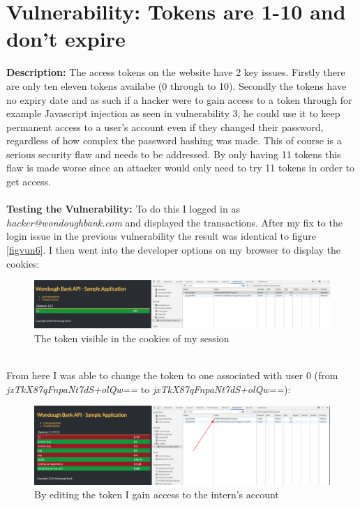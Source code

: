 \section{Vulnerability: Tokens are 1-10 and don't expire}
\label{sec:background}
\textbf{Description:} The access tokens on the website have 2 key issues. Firstly there are only ten eleven tokens availabe (0 through to 10). Secondly the tokens have no expiry
date and as such if a hacker were to gain access to a token through for example Javascript injection as seen in vulnerability 3, he could use it to keep permanent access to a
user's account even if they changed their password, regardless of how complex the password hashing was made. This of course is a serious security flaw and needs to be addressed.
By only having 11 tokens this flaw is made worse since an attacker would only need to try 11 tokens in order to get access. \\ \\
\textbf{Testing the Vulnerability:} To do this I logged in as \textit{hacker@wondoughbank.com} and displayed the transactions. After my fix to the login issue in the previous
vulnerability the result was identical to figure \ref{figvun6}. I then went into the developer options on my browser to display the cookies:
\begin{figure}[h]
    \centering
    \includegraphics[width=1\textwidth]{figs/7.1.png}
    \caption{The token visible in the cookies of my session}
    \label{7.1}
\end{figure}\\
From here I was able to change the token to one associated with user 0 (from \textit{jxTkX87qFnpaNt7dS+olQw==} to \textit{jxTkX87qFnpaNt7dS+olQw==}):
\begin{figure}[h]
    \centering
    \includegraphics[width=1\textwidth]{figs/7.2.png}
    \caption{By editing the token I gain access to the intern's account}
    \label{7.2}
\end{figure}\\

